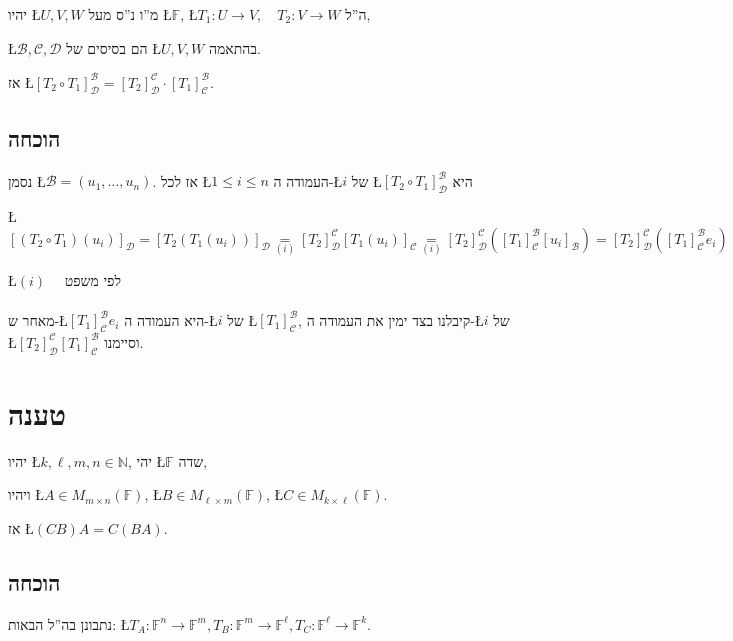 \documentclass[english,hebrew]{article}
\begin{document}
יהיו \L{$U,V,W$} מ\textquotedblright ו נ\textquotedblright ס מעל
\L{$\mathbb{F}$}, \L{$T_{1}:U\rightarrow V,\quad T_{2}:V\rightarrow W$}
ה\textquotedblright ל,

\L{$\mathcal{B},\mathcal{C},\mathcal{D}$} הם בסיסים של \L{$U,V,W$}
בהתאמה.

אז \L{$[T_{2}\circ T_{1}]_{\mathcal{D}}^{\mathcal{B}}=[T_{2}]_{\mathcal{D}}^{\mathcal{C}}\cdot[T_{1}]_{\mathcal{C}}^{\mathcal{B}}$}.

\subsection{הוכחה}

נסמן \L{$\mathcal{B}=(u_{1},\dots,u_{n})$}. אז לכל \L{$1\leq i\leq n$}
העמודה ה-\L{$i$} של \L{$[T_{2}\circ T_{1}]_{\mathcal{D}}^{\mathcal{B}}$}
היא

\L{%
\[
[(T_{2}\circ T_{1})(u_{i})]_{\mathcal{D}}=[T_{2}(T_{1}(u_{i}))]_{\mathcal{D}}\underset{(i)}{=}[T_{2}]_{\mathcal{D}}^{\mathcal{C}}[T_{1}(u_{i})]_{\mathcal{C}}\underset{(i)}{=}[T_{2}]_{\mathcal{D}}^{\mathcal{C}}([T_{1}]_{\mathcal{C}}^{\mathcal{B}}[u_{i}]_{\mathcal{B}})=[T_{2}]_{\mathcal{D}}^{\mathcal{C}}([T_{1}]_{\mathcal{C}}^{\mathcal{B}}e_{i})
\]
}%

\L{$(i)\quad$} לפי משפט\\
\\
מאחר ש-\L{$[T_{1}]_{\mathcal{C}}^{\mathcal{B}}e_{i}$} היא העמודה
ה-\L{$i$} של \L{$[T_{1}]_{\mathcal{C}}^{\mathcal{B}}$}, קיבלנו בצד
ימין את העמודה ה-\L{$i$} של \L{$[T_{2}]_{\mathcal{D}}^{\mathcal{C}}[T_{1}]_{\mathcal{C}}^{\mathcal{B}}$}
וסיימנו. 

\section{טענה}

יהיו \L{$k,\ell,m,n\in\mathbb{N}$}, יהי \L{$\mathbb{F}$} שדה,

ויהיו \L{$A\in M_{m\times n}(\mathbb{F})$}, \L{$B\in M_{\ell\times m}(\mathbb{F})$},
\L{$C\in M_{k\times\ell}(\mathbb{F})$}.

אז \L{$(CB)A=C(BA)$}.

\subsection{הוכחה}

נתבונן בה\textquotedblright ל הבאות: \L{$T_{A}:\mathbb{F}^{n}\rightarrow\mathbb{F}^{m},T_{B}:\mathbb{F}^{m}\rightarrow\mathbb{F}^{\ell},T_{C}:\mathbb{F}^{\ell}\rightarrow\mathbb{F}^{k}$}.
\end{document}

